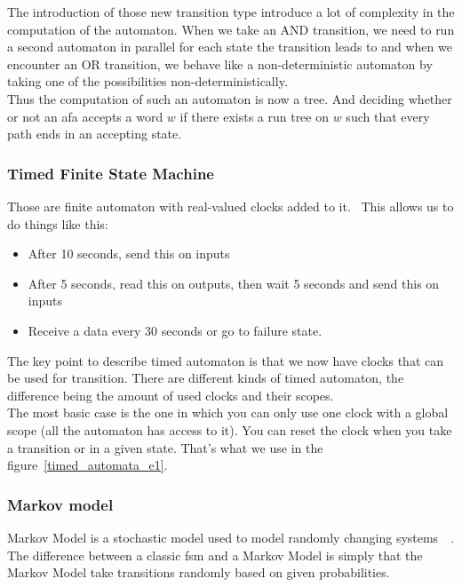 \documentclass[12pt]{article}
\begin{document}
The introduction of those new transition type introduce a lot of complexity in the computation of the automaton. When we take an AND transition, we need to run a second automaton in parallel for each state the transition leads to and when we encounter an OR transition, we behave like a non-deterministic automaton by taking one of the possibilities non-deterministically.\\

Thus the computation of such an automaton is now a tree. And deciding whether or not an \gls{afa} accepts a word $w$ if there exists a run tree on $w$ such that every path ends in an accepting state.~\cite{AFA:2017}\\

\subsubsection{Timed Finite State Machine}

Those are finite automaton with real-valued clocks added to it.~\cite{TimedAutomaton:2016} This allows us to do things like this:

\begin{itemize}
\item After 10 seconds, send this on inputs
\item After 5 seconds, read this on outputs, then wait 5 seconds and send this on inputs
\item Receive a data every 30 seconds or go to failure state.
\end{itemize}

The key point to describe timed automaton is that we now have clocks that can be used for transition. There are different kinds of timed automaton, the difference being the amount of used clocks and their scopes.\\

The most basic case is the one in which you can only use one clock with a global scope (all the automaton has access to it). You can reset the clock when you take a transition or in a given state. That's what we use in the figure~\ref{timed_automata_e1}.\\

\subsubsection{Markov model}

Markov Model is a stochastic model used to model randomly changing systems~\cite{1165342}~\cite{MarkovModel:2017}. The difference between a classic \gls{fsm} and a Markov Model is simply that the Markov Model take transitions randomly based on given probabilities.\\
\end{document}
